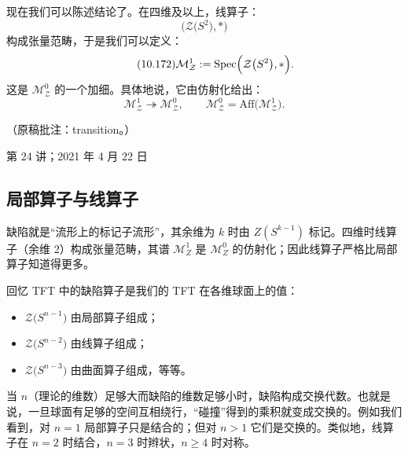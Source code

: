 现在我们可以陈述结论了。在四维及以上，线算子：
\begin{equation}\tag{10.171}
\big(\mathcal{Z}\big(S^2\big),*\big)
\end{equation}
构成张量范畴，于是我们可以定义：
\begin{equation}\tag{10.172}
\mathcal{M}_{\mathcal{Z}}^{1}:=\mathrm{Spec}\Big(\mathcal{Z}\big(S^2\big),*\Big).
\end{equation}
这是 $\mathcal{M}_{\mathcal{Z}}^{0}$ 的一个加细。具体地说，它由仿射化给出：
\begin{equation}\tag{10.173}
\mathcal{M}_{\mathcal{Z}}^{1}\twoheadrightarrow\mathcal{M}_{\mathcal{Z}}^{0},
\qquad \mathcal{M}_{\mathcal{Z}}^{0}=\mathrm{Aff}\big(\mathcal{M}_{\mathcal{Z}}^{1}\big).
\end{equation}


\begin{flushright}\small（原稿批注：transition。）\end{flushright}

\begin{flushright}\small 第 24 讲；2021 年 4 月 22 日\end{flushright}

\subsection{局部算子与线算子}\label{sec:10-8-3}

\begin{sectionkey}
缺陷就是“流形上的标记子流形”，其余维为 $k$ 时由 $Z(S^{k-1})$ 标记。四维时线算子（余维 2）构成张量范畴，其谱 $\mathcal{M}^1_Z$ 是 $\mathcal{M}^0_Z$ 的仿射化；因此线算子严格比局部算子知道得更多。
\end{sectionkey}

回忆 TFT 中的缺陷算子是我们的 TFT 在各维球面上的值：
\begin{itemize}
\item $\mathcal{Z}\big(S^{n-1}\big)$ 由局部算子组成；
\item $\mathcal{Z}\big(S^{n-2}\big)$ 由线算子组成；
\item $\mathcal{Z}\big(S^{n-3}\big)$ 由曲面算子组成，等等。
\end{itemize}
当 $n$（理论的维数）足够大而缺陷的维数足够小时，缺陷构成交换代数。也就是说，一旦球面有足够的空间互相绕行，“碰撞”得到的乘积就变成交换的。例如我们看到，对 $n=1$ 局部算子只是结合的；但对 $n>1$ 它们是交换的。类似地，线算子在 $n=2$ 时结合，$n=3$ 时辫状，$n\ge4$ 时对称。

